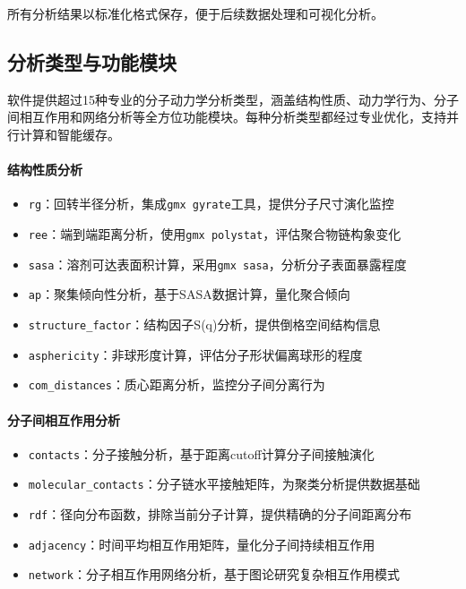 所有分析结果以标准化格式保存，便于后续数据处理和可视化分析。

\subsection{分析类型与功能模块}
\label{subsec:analysis_types}

软件提供超过15种专业的分子动力学分析类型，涵盖结构性质、动力学行为、分子间相互作用和网络分析等全方位功能模块。每种分析类型都经过专业优化，支持并行计算和智能缓存。

\paragraph{结构性质分析}

\begin{itemize}
    \item \lstinline|rg|：回转半径分析，集成\lstinline|gmx gyrate|工具，提供分子尺寸演化监控
    \item \lstinline|ree|：端到端距离分析，使用\lstinline|gmx polystat|，评估聚合物链构象变化
    \item \lstinline|sasa|：溶剂可达表面积计算，采用\lstinline|gmx sasa|，分析分子表面暴露程度
    \item \lstinline|ap|：聚集倾向性分析，基于SASA数据计算，量化聚合倾向
    \item \lstinline|structure_factor|：结构因子S(q)分析，提供倒格空间结构信息
    \item \lstinline|asphericity|：非球形度计算，评估分子形状偏离球形的程度
    \item \lstinline|com_distances|：质心距离分析，监控分子间分离行为
\end{itemize}

\paragraph{分子间相互作用分析}

\begin{itemize}
    \item \lstinline|contacts|：分子接触分析，基于距离cutoff计算分子间接触演化
    \item \lstinline|molecular_contacts|：分子链水平接触矩阵，为聚类分析提供数据基础
    \item \lstinline|rdf|：径向分布函数，排除当前分子计算，提供精确的分子间距离分布
    \item \lstinline|adjacency|：时间平均相互作用矩阵，量化分子间持续相互作用
    \item \lstinline|network|：分子相互作用网络分析，基于图论研究复杂相互作用模式
\end{itemize}

